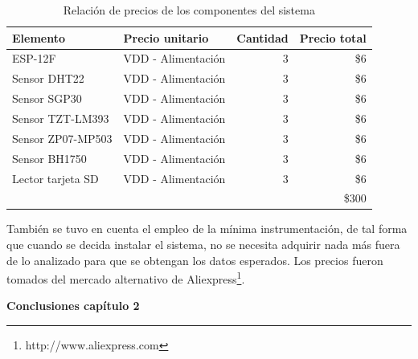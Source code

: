 \begin{table}[H]
    \centering
    \caption{Relación de precios de los componentes del sistema}
    \label{tab:precios_componentes}
    \begin{tabular}{|l|l|r|r|}
    \hline
    \cellcolor[HTML]{9698ED}Elemento    & \cellcolor[HTML]{9698ED}Precio unitario  & \cellcolor[HTML]{9698ED}Cantidad  & \cellcolor[HTML]{9698ED}Precio total  \\ \hline
    ESP-12F                             & VDD - Alimentación                       & 3                                 & \$6                                   \\ \hline
    Sensor DHT22                        & VDD - Alimentación                       & 3                                 & \$6                                   \\ \hline
    Sensor SGP30                        & VDD - Alimentación                       & 3                                 & \$6                                   \\ \hline
    Sensor TZT-LM393                    & VDD - Alimentación                       & 3                                 & \$6                                   \\ \hline
    Sensor ZP07-MP503                   & VDD - Alimentación                       & 3                                 & \$6                                   \\ \hline
    Sensor BH1750                       & VDD - Alimentación                       & 3                                 & \$6                                   \\ \hline
    Lector tarjeta SD                   & VDD - Alimentación                       & 3                                 & \$6                                   \\ \hline
                                        &                                          &                                   & \$300                                 \\ \hline
    \end{tabular}
\end{table}

También se tuvo en cuenta el empleo de la mínima instrumentación, de tal forma que cuando se decida instalar el sistema, no se necesita adquirir nada más fuera de lo analizado para que se obtengan los datos esperados.
Los precios fueron tomados del mercado alternativo de Aliexpress\footnote{http://www.aliexpress.com}.\\

        \textbf{\Large Conclusiones capítulo 2}\newline
